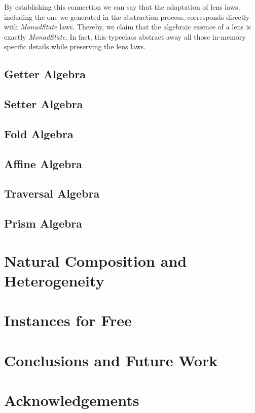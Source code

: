 \documentclass[a4paper]{article}
\begin{document}
By establishing this connection we can say that the adaptation of lens laws,
including the one we generated in the abstraction process, corresponds directly
with \emph{MonadState} laws. Thereby, we claim that the algebraic essence of a
lens is exactly \emph{MonadState}. In fact, this typeclass abstract away all those in-memory specific details while preserving the lens laws.

\subsection{Getter Algebra}

\subsection{Setter Algebra}

\subsection{Fold Algebra}

\subsection{Affine Algebra}

\subsection{Traversal Algebra}

\subsection{Prism Algebra}

\section{Natural Composition and Heterogeneity}

\section{Instances for Free}

\section{Conclusions and Future Work}

\section{Acknowledgements}

{}

\end{document}
